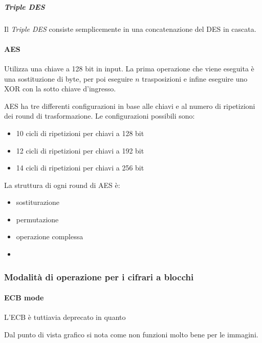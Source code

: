 \subparagraph*{Triple DES}

Il \textit{Triple DES} consiste semplicemente in una concatenazione del DES in 
cascata.

\paragraph{AES}

Utilizza una chiave a 128 bit in input. La prima operazione che viene eseguita è 
una sostituzione di byte, per poi eseguire $n$ trasposizioni e infine eseguire
uno XOR con la sotto chiave d'ingresso.

AES ha tre differenti configurazioni in base alle chiavi e al numero di 
ripetizioni dei round di trasformazione. Le configurazioni possibili sono:
\begin{itemize}
 \item 10 cicli di ripetizioni per chiavi a 128 bit
 \item 12 cicli di ripetizioni per chiavi a 192 bit
 \item 14 cicli di ripetizioni per chiavi a 256 bit
\end{itemize}


La struttura di ogni round di AES è:
\begin{itemize}
 \item sostiturazione
 \item permutazione
 \item operazione complessa
 \item {}
\end{itemize}

\subsubsection{Modalità di operazione per i cifrari a blocchi}


\paragraph{ECB mode}


L'ECB è tuttiavia deprecato in quanto 

Dal punto di vista grafico si nota come non funzioni molto bene per le 
immagini.

